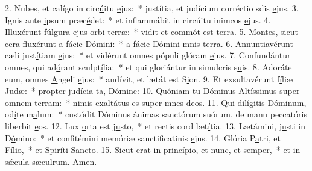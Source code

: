 2. Nubes, et calígo in circ\uline{ú}itu \uline{e}jus:~* justítia, et judícium corréctio sdis \uline{e}jus.
3. Ignis ante \uline{i}psum præc\uline{é}det:~* et inflammábit in circúitu inimcos \uline{e}jus.
4. Illuxérunt fúlgura ejus \uline{o}rbi t\uline{e}rræ:~* vidit et commót est t\uline{e}rra.
5. Montes, sicut cera fluxérunt a f\uline{á}cie D\uline{ó}mini:~* a fácie Dómini mnis t\uline{e}rra.
6. Annuntiavérunt cæli just\uline{í}tiam \uline{e}jus:~* et vidérunt omnes pópuli glóram \uline{e}jus.
7. Confundántur omnes, qui ad\uline{ó}rant sculpt\uline{í}lia:~* et qui gloriántur in simulcris s\uline{u}is.
8. Adoráte eum, omnes \uline{A}ngeli \uline{e}jus:~* audívit, et lætát est S\uline{i}on.
9. Et exsultavérunt f\uline{í}liæ J\uline{u}dæ:~* propter judícia ta, D\uline{ó}mine:
10. Quóniam tu Dóminus Altíssimus super \uline{o}mnem t\uline{e}rram:~* nimis exaltátus es super mnes d\uline{e}os.
11. Qui dilígitis Dóminum, od\uline{í}te m\uline{a}lum:~* custódit Dóminus ánimas sanctórum suórum, de manu peccatóris liberbit \uline{e}os.
12. Lux \uline{o}rta est j\uline{u}sto,~* et rectis cord læt\uline{í}tia.
13. Lætámini, j\uline{u}sti in D\uline{ó}mino:~* et confitémini memóriæ sanctificatinis \uline{e}jus.
14. Glória P\uline{a}tri, et F\uline{í}lio,~* et Spiríti S\uline{a}ncto.
15. Sicut erat in princípio, et n\uline{u}nc, et s\uline{e}mper,~* et in sǽcula sæculrum. \uline{A}men.
